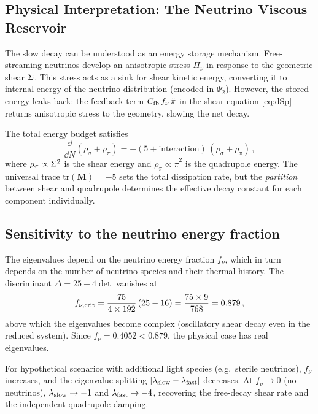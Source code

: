 \subsection{Physical Interpretation: The Neutrino Viscous Reservoir}

The slow decay can be understood as an energy storage mechanism.  Free-streaming neutrinos develop an anisotropic stress $\Pi_\nu$ in response to the geometric shear $\Sigma$.  This stress acts as a sink for shear kinetic energy, converting it to internal energy of the neutrino distribution (encoded in $\Psi_2$).  However, the stored energy leaks back: the feedback term $C_{\rm fb}\,f_\nu\,\tilde\pi$ in the shear equation \eqref{eq:dSp} returns anisotropic stress to the geometry, slowing the net decay.

The total energy budget satisfies
\begin{equation}
\frac{\dd}{\dd N}(\rho_\sigma + \rho_{\pi}) = -(5 + \text{interaction})\,(\rho_\sigma + \rho_{\pi})\,,
\end{equation}
where $\rho_\sigma \propto \Sigma^2$ is the shear energy and $\rho_\pi \propto \tilde\pi^2$ is the quadrupole energy.  The universal trace $\mathrm{tr}(\mathbf{M}) = -5$ sets the total dissipation rate, but the \emph{partition} between shear and quadrupole determines the effective decay constant for each component individually.

\subsection{Sensitivity to the neutrino energy fraction}

The eigenvalues depend on the neutrino energy fraction $f_\nu$, which in turn depends on the number of neutrino species and their thermal history.  The discriminant $\Delta = 25 - 4\det$ vanishes at
\begin{equation}
f_{\nu,\rm crit} = \frac{75}{4 \times 192}\,(25 - 16) = \frac{75 \times 9}{768} = 0.879\,,
\end{equation}
above which the eigenvalues become complex (oscillatory shear decay even in the reduced system).  Since $f_\nu = 0.4052 < 0.879$, the physical case has real eigenvalues.

For hypothetical scenarios with additional light species (e.g.\ sterile neutrinos), $f_\nu$ increases, and the eigenvalue splitting $|\lambda_{\rm slow} - \lambda_{\rm fast}|$ decreases.  At $f_\nu \to 0$ (no neutrinos), $\lambda_{\rm slow} \to -1$ and $\lambda_{\rm fast} \to -4$, recovering the free-decay shear rate and the independent quadrupole damping.

